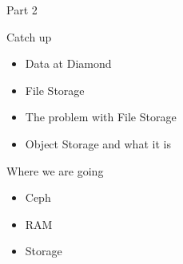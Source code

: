 \begin{frame}{Part 2}
 \begin{block}{Catch up}
        \begin{itemize}
            \item Data at Diamond
            \item File Storage
            \item The problem with File Storage
            \item Object Storage and what it is
        \end{itemize}
    \end{block}
 \begin{block}{Where we are going}
 \begin{itemize}
     \item Ceph
     \item RAM
     \item Storage
 \end{itemize}
 \end{block}
\end{frame}